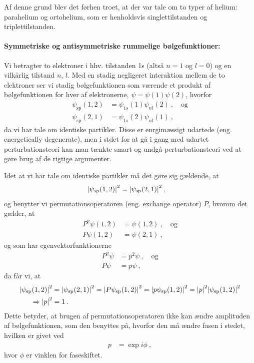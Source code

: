 Af denne grund blev det førhen troet, at der var tale om to typer af helium: \textsf{parahelium} og \textsf{ortohelium}, som er henholdsvis singlettilstanden og triplettilstanden.


\paragraph{Symmetriske og antisymmetriske rummelige bølgefunktioner:} Vi betragter to elektroner i hhv. tilstanden 1s (altså $n=1$ og $l=0$) og en vilkårlig tilstand $n,\,l$. Med en stadig negligeret interaktion mellem de to elektroner ser vi stadig bølgefunktionen som værende et produkt af bølgefunktionen for hver af elektronerne, $\psi = \psi(1)\psi(2)$, hvorfor
\begin{align}
    \psi_\text{sp}(1,2) &= \psi_{1s}(1)\psi_{nl}(2) \: , \quad \text{og} \\
    \psi_\text{sp}(2,1) &= \psi_{1s}(2)\psi_{nl}(1) \: ,
\end{align}
da vi har tale om identiske partikler. Disse er enrgimæssigt udartede (eng. energetically degenerate), men i stdet for at gå i gang med udartet perturbationsteori kan man tænkte smart og undgå perturbationsteori ved at gøre brug af de rigtige argumenter.

Idet at vi har tale om identiske partikler må det gøre sig gældende, at
\begin{align}
    \abs{\psi_\text{sp}(1,2)}^2 &= \abs{\psi_\text{sp}(2,1)}^2 \: ,
\end{align}
og benytter vi \textsf{permutationsoperatoren} (eng. exchange operator) $P$, hvorom det gælder, at
\begin{align}
    P^2 \psi(1,2) &= \psi(1,2) \: , \quad \text{og} \label{eq:Q12_ExchangeOperatorDefinitions1} \\
    P \psi(1,2) &= \psi(2,1) \: ,\label{eq:Q12_ExchangeOperatorDefinitions2}
\end{align}
og som har egenvektorfunktionerne
\begin{align}
    P^2 \psi &= p^2 \psi \: , \quad \text{og} \label{eq:Q12_ExchangeOperatorEingenValueFunctions1} \\
    P \psi &= p \psi \: , \label{eq:Q12_ExchangeOperatorEingenValueFunctions2}
\end{align}
da får vi, at
\begin{align}
    \abs{\psi_\text{sp}(1,2)}^2 &= \abs{\psi_\text{sp}(2,1)}^2
    = \abs{P\psi_\text{sp}(1,2)}^2
    = \abs{p\psi_\text{sp}(1,2)}^2
    = \abs{p}^2 \abs{\psi_\text{sp}(1,2)}^2 \nonumber\\
    \Rightarrow \abs{p}^2 &= 1 \: .
\end{align}
Dette betyder, at brugen af permutationsoperatoren ikke kan ændre amplituden af bølgefunktionen, som den benyttes på, hvorfor den må ændre fasen i stedet, hvilken er givet ved
\begin{align} \label{eq:Q12_FaseskiftP}
    p &= \exp{i\phi} \: ,
\end{align}
hvor $\phi$ er vinklen for faseskiftet.

